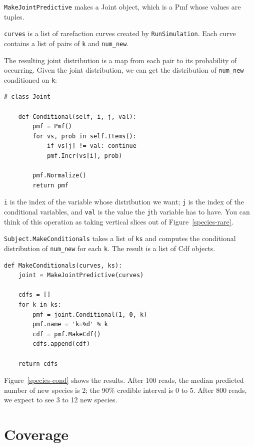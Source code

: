 \documentclass[12pt]{book}
\begin{document}
{\tt MakeJointPredictive} makes a Joint object, which is a
Pmf whose values are tuples.

{\tt curves} is a list of rarefaction curves created by
{\tt RunSimulation}.  Each curve contains a list of pairs of
{\tt k} and \verb"num_new".

The resulting joint distribution is a map from each pair to
its probability of occurring.  Given the joint distribution, we
can get the distribution of \verb"num_new" conditioned on {\tt k}:

\begin{verbatim}
# class Joint

    def Conditional(self, i, j, val):
        pmf = Pmf()
        for vs, prob in self.Items():
            if vs[j] != val: continue
            pmf.Incr(vs[i], prob)

        pmf.Normalize()
        return pmf
\end{verbatim}

{\tt i} is the index of the variable whose distribution we want;
{\tt j} is the index of the conditional variables, and {\tt val}
is the value the {\tt j}th variable has to have.
You can think of this operation as taking vertical slices out
of Figure~\ref{species-rare}.

{\tt Subject.MakeConditionals} takes a list of {\tt ks}
and computes the conditional distribution of \verb"num_new"
for each {\tt k}.  The result is a list of Cdf objects.

\begin{verbatim}
def MakeConditionals(curves, ks):
    joint = MakeJointPredictive(curves)

    cdfs = []
    for k in ks:
        pmf = joint.Conditional(1, 0, k)
        pmf.name = 'k=%d' % k
        cdf = pmf.MakeCdf()
        cdfs.append(cdf)

    return cdfs
\end{verbatim}

Figure~\ref{species-cond} shows the results.  After 100 reads, the
median predicted number of new species is 2; the 90\% credible
interval is 0 to 5.  After 800 reads, we expect to see 3 to 12 new
species.


\section{Coverage}
\end{document}
